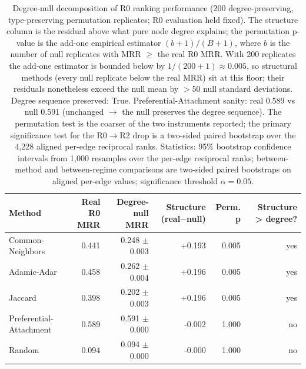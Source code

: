 \begin{table}[H]
\centering
\caption{Degree-null decomposition of R0 ranking performance (200 degree-preserving, type-preserving permutation replicates; R0 evaluation held fixed). The structure column is the residual above what pure node degree explains; the permutation p-value is the add-one empirical estimator $(b+1)/(B+1)$, where $b$ is the number of null replicates with MRR $\geq$ the real R0 MRR. With 200 replicates the add-one estimator is bounded below by $1/(200+1)\approx0.005$, so structural methods (every null replicate below the real MRR) sit at this floor; their residuals nonetheless exceed the null mean by $>$50 null standard deviations. Degree sequence preserved: True. Preferential-Attachment sanity: real 0.589 vs null 0.591 (unchanged $\to$ the null preserves the degree sequence). The permutation test is the coarser of the two instruments reported; the primary significance test for the R0$\to$R2 drop is a two-sided paired bootstrap over the 4,228 aligned per-edge reciprocal ranks. Statistics: 95\% bootstrap confidence intervals from 1,000 resamples over the per-edge reciprocal ranks; between-method and between-regime comparisons are two-sided paired bootstraps on aligned per-edge values; significance threshold $\alpha = 0.05$.}
\label{tab:degree_null}
\begin{tabular}{lrrrrr}
\toprule
Method & Real R0 MRR & Degree-null MRR & Structure (real$-$null) & Perm. p & Structure > degree? \\
\midrule
Common-Neighbors & 0.441 & 0.248 $\pm$ 0.003 & +0.193 & 0.005 & yes \\
Adamic-Adar & 0.458 & 0.262 $\pm$ 0.004 & +0.196 & 0.005 & yes \\
Jaccard & 0.398 & 0.202 $\pm$ 0.003 & +0.196 & 0.005 & yes \\
Preferential-Attachment & 0.589 & 0.591 $\pm$ 0.000 & -0.002 & 1.000 & no \\
Random & 0.094 & 0.094 $\pm$ 0.000 & -0.000 & 1.000 & no \\
\bottomrule
\end{tabular}
\end{table}
